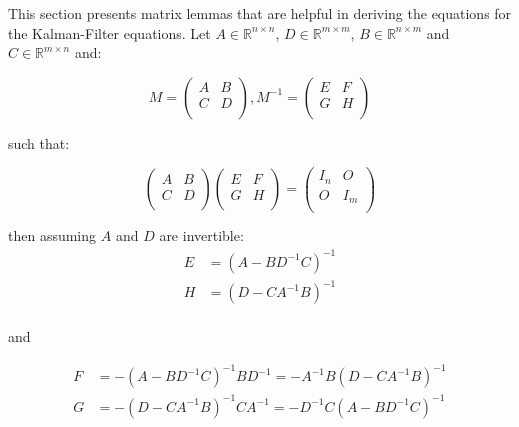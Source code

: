 \documentclass[
]{article}
\begin{document}
This section presents matrix lemmas that are helpful in deriving the
equations for the Kalman-Filter equations. Let
\(A \in \mathbb{R}^{n \times n}\), \(D \in \mathbb{R}^{m \times m}\),
\(B \in \mathbb{R}^{n \times m}\) and \(C \in \mathbb{R}^{m \times n}\)
and:

\[
\begin{equation*}
        M = \begin{pmatrix}
            A & B \\ 
            C & D \\ 
        \end{pmatrix}, 
        M^{-1} = \begin{pmatrix}
            E & F \\ 
            G & H \\ 
        \end{pmatrix}
\end{equation*}
\]

such that:

\[
\begin{equation*} 
    \begin{pmatrix}
        A & B \\ 
        C & D \\ 
    \end{pmatrix} 
    \begin{pmatrix}
        E & F \\ 
        G & H \\ 
    \end{pmatrix} = 
    \begin{pmatrix}
        I_n & O \\ 
        O & I_m \\ 
    \end{pmatrix} 
\end{equation*}
\]

then assuming \(A\) and \(D\) are invertible: \[
\begin{equation*} 
    \begin{aligned}
        E &= (A - BD^{-1}C)^{-1} \\
        H &= (D - CA^{-1}B)^{-1} \\
    \end{aligned}
\end{equation*}
\]

and

\[
\begin{equation*}
    \begin{aligned}
        F &= - (A - BD^{-1}C)^{-1}BD^{-1} = - A^{-1}B(D - CA^{-1}B)^{-1} \\
        G &= - (D - CA^{-1}B)^{-1}CA^{-1} = - D^{-1}C(A - BD^{-1}C)^{-1} \\
    \end{aligned}
\end{equation*}
\]
\end{document}
